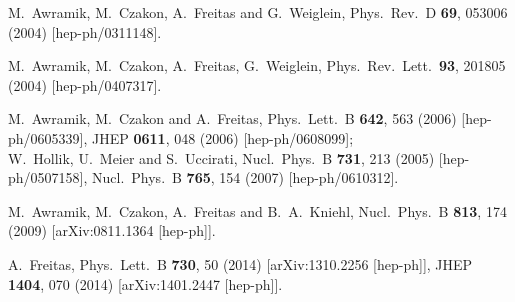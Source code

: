 \documentclass[Physsubmission, Phys]{SciPost}
\begin{document}
\begin{thebibliography}{100}
  M.~Awramik, M.~Czakon, A.~Freitas and G.~Weiglein,
  Phys.\ Rev.\ D {\bf 69}, 053006 (2004)
  [hep-ph/0311148].

  M.~Awramik, M.~Czakon, A.~Freitas, G.~Weiglein,
  Phys.\ Rev.\ Lett.\  {\bf 93}, 201805 (2004)
  [hep-ph/0407317].

  M.~Awramik, M.~Czakon and A.~Freitas,
  Phys.\ Lett.\  B {\bf 642}, 563 (2006)
  [hep-ph/0605339],
  JHEP {\bf 0611}, 048 (2006)
  [hep-ph/0608099];\\
  W.~Hollik, U.~Meier and S.~Uccirati,
  Nucl.\ Phys.\ B {\bf 731}, 213 (2005)
  [hep-ph/0507158],
  Nucl.\ Phys.\ B {\bf 765}, 154 (2007)
  [hep-ph/0610312].

  M.~Awramik, M.~Czakon, A.~Freitas and B.~A.~Kniehl,
  Nucl.\ Phys.\  B {\bf 813}, 174 (2009)
  [arXiv:0811.1364 [hep-ph]].

  A.~Freitas,
  Phys.\ Lett.\ B {\bf 730}, 50 (2014)
  [arXiv:1310.2256 [hep-ph]],
  JHEP {\bf 1404}, 070 (2014)
  [arXiv:1401.2447 [hep-ph]].


\end{thebibliography}
\end{document}
